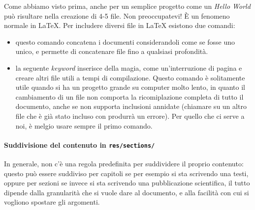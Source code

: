 Come abbiamo visto prima, anche per un semplice progetto come un \textit{Hello
World} può risultare nella creazione di 4-5 file. Non preoccupatevi! È un
fenomeno normale in \LaTeX{}.
Per includere diversi file in \LaTeX{} esistono due comandi:
\begin{itemize}
 \item \verb!! questo comando concatena i documenti considerandoli
come se fosse uno unico, e permette di concatenare file fino a qualsiasi
profondità.
 \item \verb!! la seguente \textit{keyword} inserisce della magia,
come un'interruzione di pagina e creare altri file utili a tempi di
compilazione. Questo comando è solitamente utile quando si ha un progetto
grande su computer molto lento, in quanto il cambiamento di un file non
comporta la ricomiplazione completa di tutto il documento, anche se non
supporta inclusioni annidate (chiamare \verb!! su un altro file che
è già stato incluso con \verb!! produrrà un errore). Per quello che
ci serve a noi, è melgio usare sempre il primo comando.
\end{itemize}

\paragraph*{Suddivisione del contenuto in \texttt{res/sections/}} In generale,
non c'è una regola predefinita per suddividere il proprio contenuto: questo può
essere suddiviso per capitoli se per esempio si sta scrivendo una testi, oppure
per sezioni se invece si sta scrivendo una pubblicazione scientifica, il tutto
dipende dalla granularità che si vuole dare al documento, e alla facilità con
cui si vogliono spostare gli argomenti.
